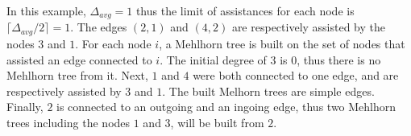 \documentclass{article}
\begin{document}
In this example, $\Delta_{avg} = 1$ thus the limit of assistances
for each node is $\lceil\Delta_{avg}/2\rceil = 1$. The edges $(2,1)$
and $(4,2)$ are respectively assisted by the nodes $3$ and $1$.
For each node $i$, a Mehlhorn tree is built on the set of nodes that
assisted an edge connected to $i$.
The initial degree of $3$ is $0$, thus there is no Mehlhorn tree from it.
Next, $1$ and $4$ were both connected to one edge, and are respectively
assisted by $3$ and $1$. The built Melhorn trees are simple edges.
Finally, $2$ is connected to an outgoing and an ingoing edge, thus two
Mehlhorn trees including the nodes $1$ and $3$, will be built from $2$.
\end{document}
